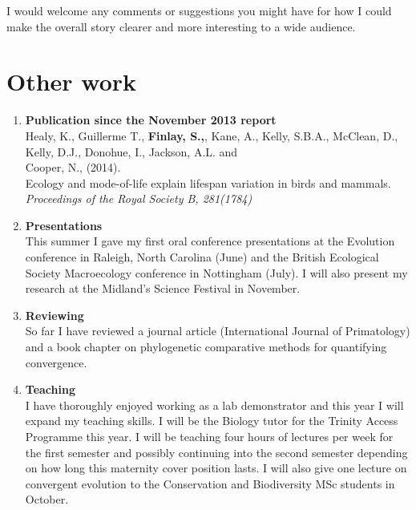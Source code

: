 \documentclass[12pt,a4paper]{article}
\begin{document}
	I would welcome any comments or suggestions you might have for how I could make the overall story clearer and more interesting to a wide audience.
	

	


\section{Other work}
	
	\begin{enumerate}

	\item \textbf{Publication since the November 2013 report}\\
		Healy, K., Guillerme T., \textbf{Finlay, S.,}, Kane, A., Kelly, S.B.A., McClean, D., Kelly, D.J., Donohue, I., Jackson, A.L. and \\Cooper, N., (2014).\\
		Ecology and mode-of-life explain lifespan variation in birds and mammals. \textit{Proceedings of the Royal Society B, 281(1784)} 

	\item \textbf{Presentations}\\
		This summer I gave my first oral conference presentations at the Evolution conference in Raleigh, North Carolina (June) and the British Ecological Society Macroecology conference in Nottingham (July). I will also present my research at the Midland's Science Festival in November. 

	\item \textbf{Reviewing}\\
		So far I have reviewed a journal article (International Journal of Primatology) and a book chapter on phylogenetic comparative methods for quantifying convergence.
		
	\item \textbf{Teaching}\\	
		I have thoroughly enjoyed working as a lab demonstrator and this year I will expand my teaching skills. I will be the Biology tutor for the Trinity Access Programme this year. I will be teaching four hours of lectures per week for the first semester and possibly continuing into the second semester depending on how long this maternity cover position lasts. I will also give one lecture on convergent evolution to the Conservation and Biodiversity MSc students in October.

	\end{enumerate}

\end{document}
